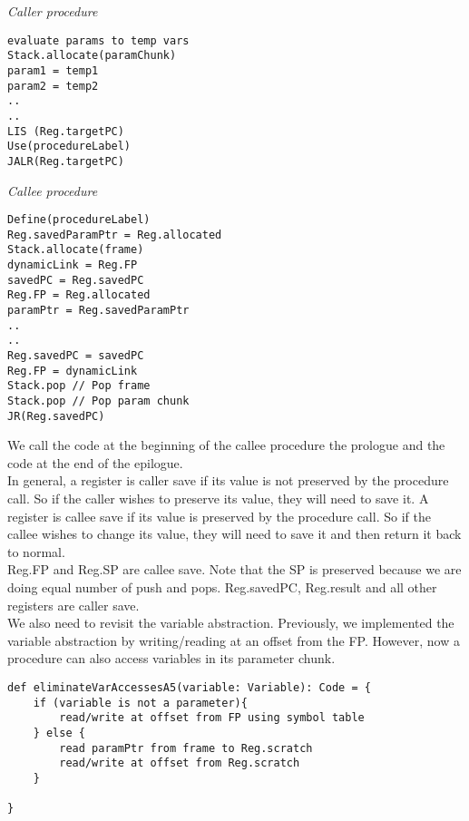 \documentclass[12pt, letterpaper]{article}
\begin{document}
\begin{minipage}[t]{0.5\textwidth}
\emph{Caller procedure}
\begin{verbatim}
evaluate params to temp vars 
Stack.allocate(paramChunk)
param1 = temp1
param2 = temp2
..
..
LIS (Reg.targetPC)
Use(procedureLabel)
JALR(Reg.targetPC)
\end{verbatim}
\end{minipage}
\begin{minipage}[t]{0.5\textwidth}
\emph{Callee procedure}
\begin{verbatim}
Define(procedureLabel)
Reg.savedParamPtr = Reg.allocated
Stack.allocate(frame)
dynamicLink = Reg.FP
savedPC = Reg.savedPC
Reg.FP = Reg.allocated
paramPtr = Reg.savedParamPtr
..
..
Reg.savedPC = savedPC
Reg.FP = dynamicLink
Stack.pop // Pop frame
Stack.pop // Pop param chunk
JR(Reg.savedPC)
\end{verbatim}
\end{minipage}

\vspace{7mm}

We call the code at the beginning of the callee procedure the prologue and the code at the end of the epilogue.\\

In general, a register is caller save if its value is not preserved by the procedure call. So if the caller wishes to preserve its value, they will need to save it. A register is callee save if its value is preserved by the procedure call. So if the callee wishes to change its value, they will need to save it and then return it back to normal.\\

Reg.FP and Reg.SP are callee save. Note that the SP is preserved because we are doing equal number of push and pops. Reg.savedPC, Reg.result and all other registers are caller save.\\

We also need to revisit the variable abstraction. Previously, we implemented the variable abstraction by writing/reading at an offset from the FP. However, now a procedure can also access variables in its parameter chunk.\\

\begin{lstlisting}
def eliminateVarAccessesA5(variable: Variable): Code = {
	if (variable is not a parameter){
		read/write at offset from FP using symbol table
	} else {
		read paramPtr from frame to Reg.scratch
		read/write at offset from Reg.scratch
	}

}
\end{lstlisting}
\end{document}
